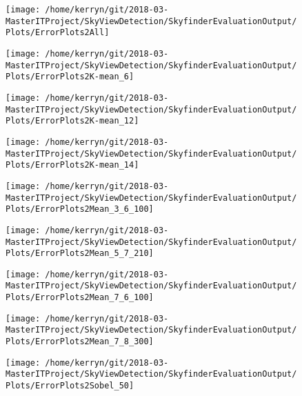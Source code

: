 \documentclass[final,3p,times,authoryear]{elsarticle}
\begin{document}
\begin{figure}
\centering
\texttt{[image: /home/kerryn/git/2018-03-MasterITProject/SkyViewDetection/SkyfinderEvaluationOutput/Plots/ErrorPlots2All]}
\caption{}
\label{fig:errorplots2all}
\end{figure}
\begin{figure}
\centering
\texttt{[image: /home/kerryn/git/2018-03-MasterITProject/SkyViewDetection/SkyfinderEvaluationOutput/Plots/ErrorPlots2K-mean\_6]}
\caption{}
\label{fig:errorplots2k-mean6}
\end{figure}
\begin{figure}
\centering
\texttt{[image: /home/kerryn/git/2018-03-MasterITProject/SkyViewDetection/SkyfinderEvaluationOutput/Plots/ErrorPlots2K-mean\_12]}
\caption{}
\label{fig:errorplots2k-mean12}
\end{figure}
\begin{figure}
\centering
\texttt{[image: /home/kerryn/git/2018-03-MasterITProject/SkyViewDetection/SkyfinderEvaluationOutput/Plots/ErrorPlots2K-mean\_14]}
\caption{}
\label{fig:errorplots2k-mean14}
\end{figure}
\begin{figure}
\centering
\texttt{[image: /home/kerryn/git/2018-03-MasterITProject/SkyViewDetection/SkyfinderEvaluationOutput/Plots/ErrorPlots2Mean\_3\_6\_100]}
\caption{}
\label{fig:errorplots2mean36100}
\end{figure}
\begin{figure}
\centering
\texttt{[image: /home/kerryn/git/2018-03-MasterITProject/SkyViewDetection/SkyfinderEvaluationOutput/Plots/ErrorPlots2Mean\_5\_7\_210]}
\caption{}
\label{fig:errorplots2mean57210}
\end{figure}
\begin{figure}
\centering
\texttt{[image: /home/kerryn/git/2018-03-MasterITProject/SkyViewDetection/SkyfinderEvaluationOutput/Plots/ErrorPlots2Mean\_7\_6\_100]}
\caption{}
\label{fig:errorplots2mean76100}
\end{figure}
\begin{figure}
\centering
\texttt{[image: /home/kerryn/git/2018-03-MasterITProject/SkyViewDetection/SkyfinderEvaluationOutput/Plots/ErrorPlots2Mean\_7\_8\_300]}
\caption{}
\label{fig:errorplots2mean78300}
\end{figure}
\begin{figure}
\centering
\texttt{[image: /home/kerryn/git/2018-03-MasterITProject/SkyViewDetection/SkyfinderEvaluationOutput/Plots/ErrorPlots2Sobel\_50]}
\caption{}
\label{fig:errorplots2sobel50}
\end{figure}
\end{document}
